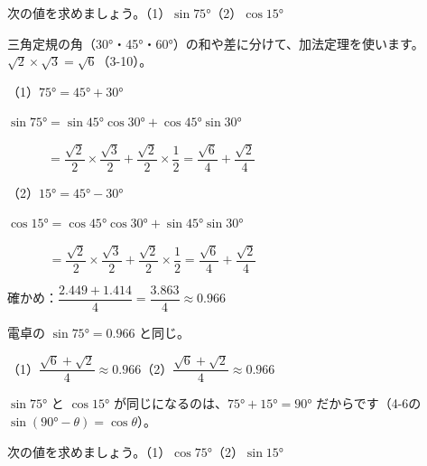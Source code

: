 
\begin{reidai}[加法定理で値を求める]
次の値を求めましょう。\quad（1）$\sin75°$\quad（2）$\cos15°$\par
\kangaekata 三角定規の角（30°・45°・60°）の和や差に分けて、加法定理を使います。$\sqrt2\times\sqrt3=\sqrt6$（3-10）。\par
\shiki{}\zw{} （1）$75°=45°+30°$\par
\bkivjb $\sin75°=\sin45°\cos30°+\cos45°\sin30°$\par
\bkivjb $\phantom{\sin75°}=\dfrac{\sqrt2}{2}\times\dfrac{\sqrt3}{2}+\dfrac{\sqrt2}{2}\times\dfrac12=\dfrac{\sqrt6}{4}+\dfrac{\sqrt2}{4}$\par
\bkivjq （2）$15°=45°-30°$\par
\bkivjb $\cos15°=\cos45°\cos30°+\sin45°\sin30°$\par
\bkivjb $\phantom{\cos15°}=\dfrac{\sqrt2}{2}\times\dfrac{\sqrt3}{2}+\dfrac{\sqrt2}{2}\times\dfrac12=\dfrac{\sqrt6}{4}+\dfrac{\sqrt2}{4}$\par
\bkivjb 確かめ：$\dfrac{2.449+1.414}{4}=\dfrac{3.863}{4}\approx0.966$\par
\bkivjb 電卓の $\sin75°=0.966$ と同じ。\par
\kotae{}\zw{} （1）$\dfrac{\sqrt6+\sqrt2}{4}\approx0.966$\quad（2）$\dfrac{\sqrt6+\sqrt2}{4}\approx0.966$
\end{reidai}
$\sin75°$ と $\cos15°$ が同じになるのは、$75°+15°=90°$ だからです（4-6の $\sin(90°-\theta)=\cos\theta$）。

\begin{jibun}
次の値を求めましょう。\quad（1）$\cos75°$\quad（2）$\sin15°$
\end{jibun}

